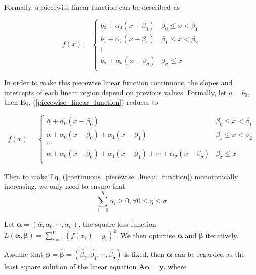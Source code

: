 Formally, a piecewise linear function can be described as 

\begin{equation}
\label{piecewise_linear_function}
	f(x)= \begin{cases} 
      b_0+\alpha_0(x-\beta_0) & \beta_0\leq x < \beta_1 \\
      b_1+\alpha_1(x-\beta_1) &  \beta_1\leq x < \beta_2 \\
      \vdots \\
      b_\sigma+\alpha_\sigma(x-\beta_\sigma) &  \beta_\sigma\leq x \\
   \end{cases}
\end{equation}

In order to make this piecewise linear function continuous, the slopes and intercepts of each linear region depend on previous values. Formally, let $\bar{a}=b_0$, then Eq. (\ref{piecewise_linear_function}) reduces to

\begin{equation}
	\label{continuous_piecewise_linear_function}
	f(x)= \begin{cases} 
      \bar{\alpha}+\alpha_0(x-\beta_0) & \beta_0\leq x < \beta_1 \\
      \bar{\alpha}+\alpha_0(x-\beta_0) + \alpha_1(x-\beta_1) &  \beta_1\leq x < \beta_2 \\
      \cdots \\
      \bar{\alpha}+\alpha_0(x-\beta_0) + \alpha_1(x-\beta_1)+\cdots+\alpha_\sigma(x-\beta_\sigma) &  \beta_\sigma\leq x \\
   \end{cases}
\end{equation}


Then to make Eq. (\ref{continuous_piecewise_linear_function}) monotonically increasing, we only need to ensure that $$\sum_{i=0}^\eta \alpha_i\geq 0, \forall 0\leq \eta\leq \sigma$$

Let $\boldsymbol{\alpha}=(\bar{\alpha},\alpha_0,\cdots,\alpha_\sigma)$, the square loss function $L(\boldsymbol{\alpha},\boldsymbol{\beta})=\sum_{i=1}^{V}(f(x_i)-y_i)^2$. We then optimise $\boldsymbol{\alpha}$ and $\boldsymbol{\beta}$ iteratively.

Assume that $\boldsymbol{\beta}=\hat{\boldsymbol{\beta}}=(\hat{\beta_0},\hat{\beta_1},\cdots,\hat{\beta_\sigma})$ is fixed, then $\boldsymbol{\alpha}$ can be regarded as the least square solution of the linear equation $\boldsymbol{A\alpha}=\boldsymbol{y}$, where


